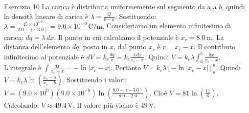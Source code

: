 \documentclass[a4paper]{article}
\begin{document}
\begin{snippetsolution}{Esercizio 10}
    La carica è distribuita uniformemente sul segmento da \(a\) a \(b\), quindi
    la densità lineare di carica è
    \(\lambda = \frac{Q}{b-a}.\)
    Sostituendo:
    \(\lambda = \frac{45 \times 10^{-9}}{2.0 - (-3.0)} = 9.0 \times 10^{-9}\,\mathrm{C/m}.\)
    Consideriamo un elemento infinitesimo di carica:
    \(dq = \lambda\,dx.\)
    Il punto in cui calcoliamo il potenziale è \(x_c = 8.0\,\mathrm{m}\).
    La distanza dell'elemento \(dq\), posto in \(x\), dal punto \(x_c\) è
    \(r = x_c - x.\)
    Il contributo infinitesimo al potenziale è
    \(dV = k_e\frac{dq}{r} = k_e\frac{\lambda\,dx}{x_c - x}.\)
    Quindi
    \(V = k_e\lambda \int_a^b \frac{dx}{x_c - x}.\)
    L'integrale è
    \(\int \frac{dx}{x_c - x} = -\ln|x_c - x|.\)
    Pertanto
    \(V = k_e\lambda \left[ -\ln|x_c - x| \right]_a^b.\)
    Quindi
    \(V = k_e\lambda \ln \left( \frac{x_c - a}{x_c - b} \right).\)
    Sostituendo i valori:
    \(V = \left(9.0 \times 10^9\right) \left(9.0 \times 10^{-9}\right) \ln \left( \frac{8.0 - (-3.0)}{8.0 - 2.0} \right).\)
    Cioè
    \(V = 81 \ln \left( \frac{11}{6} \right).\)
    Calcolando:
    \(V \approx 49.4\,\mathrm{V}.\)
    Il valore più vicino è
    \(\boxed{49\,\mathrm{V}}.\)
\end{snippetsolution}
\pagebreak
\end{document}
